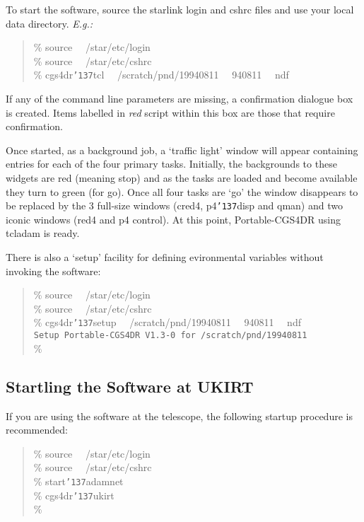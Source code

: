 \documentclass[a4paper]{book}
\renewcommand{\_}{{\tt\char'137}}
\begin{document}
To start the software, source the {\sc starlink} login and cshrc files and
use your local data directory. {\em E.g.:}

\begin{minipage}{120mm}
\begin{quote}
  \%  source \ \ /star/etc/login \\
  \%  source \ \ /star/etc/cshrc \\
  \%  cgs4dr\_tcl \ \ /scratch/pnd/19940811 \ \ 940811 \ \ ndf
\end{quote}
\end{minipage}

If any of the command line parameters are missing, a confirmation dialogue box
is created. Items labelled in {\em red} script within this box are those that
require confirmation.

Once started, as a background job, a `traffic light' window will appear containing entries
for each of the four primary tasks. Initially, the backgrounds to these widgets are red
(meaning stop) and as the tasks are loaded and become available they turn to green (for go).
Once all four tasks are `go' the window disappears to be replaced by the 
3 full-size windows (cred4, p4\_disp and qman) and two iconic windows
(red4 and p4 control). At this point, Portable-CGS4DR using {\sc tcladam} is
ready.

There is also a `setup' facility for defining evironmental variables without
invoking the software:

\begin{minipage}{120mm}
\begin{quote}
  \%  source \ \ /star/etc/login \\
  \%  source \ \ /star/etc/cshrc \\
  \%  cgs4dr\_setup \ \ /scratch/pnd/19940811 \ \ 940811 \ \ ndf \\[4ex]
      {\tt Setup Portable-CGS4DR V1.3-0 for /scratch/pnd/19940811} \\[2ex]
  \%
\end{quote}
\end{minipage}

\subsection{Startling the Software at UKIRT}
If you are using the software at the telescope, the following startup procedure is
recommended:

\begin{minipage}{120mm}
\begin{quote}
  \%  source \ \ /star/etc/login \\
  \%  source \ \ /star/etc/cshrc \\
  \%  start\_adamnet \\
  \%  cgs4dr\_ukirt \\
  \%
\end{quote}
\end{minipage}
\end{document}
